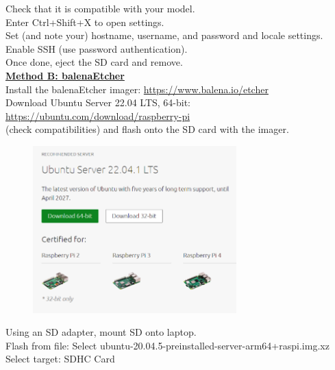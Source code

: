 \documentclass[a4paper, 10pt]{article}
\begin{document}
        Check that it is compatible with your model. \\
        Enter Ctrl+Shift+X to open settings. \\
        Set (and note your) hostname, username, and password and locale settings. \\
        Enable SSH (use password authentication). \\
        
        Once done, eject the SD card and remove. \\ 
    
    
        \underline{\textbf{Method B: balenaEtcher}} \\
        Install the balenaEtcher imager: \url{https://www.balena.io/etcher} \\
    
        Download Ubuntu Server 22.04 LTS, 64-bit: \\ \url{https://ubuntu.com/download/raspberry-pi} \\
        (check compatibilities) and flash onto the SD card with the imager. \\
    
        \begin{figure}[h]
            \centering
            \includegraphics[width=0.7\textwidth]{media/ubuntu_server_image.png}
            \label{fig:ubuntu-server}
        \end{figure}
    
        
        Using an SD adapter, mount SD onto laptop.\\
        Flash from file: Select ubuntu-20.04.5-preinstalled-server-arm64+raspi.img.xz \\
        Select target: SDHC Card \\
        
\end{document}
